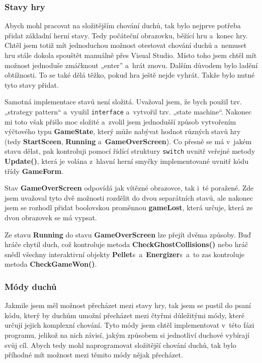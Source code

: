 \documentclass[a4]{article}
\begin{document}
\subsubsection{Stavy hry} \label{gamestates}
Abych mohl pracovat na složitějším chování duchů, tak bylo nejprve potřeba přidat základní herní stavy. Tedy počáteční obrazovku, běžící hru a~konec hry. Chtěl jsem totiž mít jednoduchou možnost otestovat chování duchů a~nemuset hru stále dokola spouštět manuálně přes Visual Studio. Místo toho jsem chtěl mít možnost jednoduše zmáčknout „enter” a~hrát znovu. Dalším důvodem bylo ladění obtížnosti. To se také dělá těžko, pokud hra ještě nejde vyhrát. Takže bylo nutné tyto stavy přidat.

Samotná implementace stavů není složitá. Uvažoval jsem, že bych použil tzv. „strategy pattern“ a~využil \verb|interface| a~vytvořil tzv. „state machine“. Nakonec mi toto však přišlo moc složité a~zvolil jsem jednodušší způsob vytvořením výčtového typu \textbf{GameState}, který může nabývat hodnot různých stavů hry (tedy \textbf{StartSceen}, \textbf{Running} a~\textbf{GameOverScreen}). Co přesně se má v~jakém stavu dělat, pak kontroluji pomocí řídící struktury \verb|switch| uvnitř veřejné metody \textbf{Update()}, která je volána z~hlavní herní smyčky implementované uvnitř kódu třídy \textbf{GameForm}. 

Stav \textbf{GameOverScreen} odpovídá jak vítězné obrazovce, tak i~té poražené. Zde jsem uvažoval tyto dvě možnosti rozdělit do dvou separátních stavů, ale nakonec jsem se rozhodl přidat boolovskou proměnnou \textbf{gameLost}, která určuje, která ze dvou obrazovek se má vypsat.

Ze stavu \textbf{Running} do stavu \textbf{GameOverScreen} lze přejít dvěma způsoby. Buď hráče chytil duch, což kontroluje metoda \textbf{CheckGhostCollisions()} nebo hráč snědl všechny interaktivní objekty \textbf{Pellet}s~a~\textbf{Energizer}s~a~to zas kontroluje metoda \textbf{CheckGameWon()}.

\subsubsection{Módy duchů} \label{generalmodes}
Jakmile jsem měl možnost přecházet mezi stavy hry, tak jsem se pustil do psaní kódu, který by duchům umožní přecházet mezi čtyřmi důležitými módy, které určují jejich komplexní chování. Tyto módy jsem chtěl implementovat v~této fázi programu, jelikož na nich závisí, jakým způsobem si jednotliví duchové vybírají svůj cíl. Abych tedy mohl naprogramovat složitější chování duchů, tak bylo příhodné mít možnost mezi těmito módy nějak přecházet.
\end{document}
